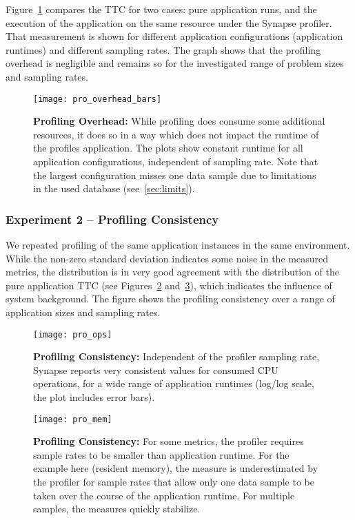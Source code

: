 \documentclass[10pt, conference, compsocconf]{IEEEtran}
\newcommand{\synapse}{Synapse\xspace}
\begin{document}
 Figure~\ref{fig:pro_overhead} compares the TTC for two cases: pure
 application runs, and the execution of the application on the
 same resource under the \synapse profiler.  That measurement is shown
 for different application configurations (application runtimes) and
 different sampling rates.  The graph shows that the profiling overhead
 is negligible and remains so for the
 investigated range of problem sizes and sampling rates.

 \begin{figure}[t]
   \centering
   \texttt{[image: pro\_overhead\_bars]}
   \caption{\textbf{Profiling Overhead:} While profiling does consume
       some additional resources, it does so in a way which does not
       impact the runtime of the profiles application.  The plots show
       constant runtime for all application configurations,
       independent of sampling rate. Note that the largest
       configuration misses one data sample due to limitations in the
       used database (see~\ref{sec:limits}).
     \label{fig:pro_overhead} 
   } 
   \end{figure}


 \subsubsection*{Experiment 2 -- Profiling Consistency}

 We repeated profiling of the same application instances in the same
 environment.  While the non-zero standard deviation indicates some
 noise in the measured metrics, the distribution is in very good
 agreement with the distribution of the pure application TTC (see
 Figures~\ref{fig:pro_ops} and~\ref{fig:pro_mem}), which indicates the
 influence of system background.  The figure shows the profiling
 consistency over a range of application sizes and sampling rates.

 \begin{figure}[t]
   \centering
   \texttt{[image: pro\_ops]}
   \caption{\textbf{Profiling Consistency:} Independent of the
       profiler sampling rate, \synapse reports very consistent
       values for consumed CPU operations, for a wide range of
       application runtimes (log/log scale, the plot includes
       error bars).
     \label{fig:pro_ops} 
   } 
   \end{figure}

 \begin{figure}[t]
   \centering
   \texttt{[image: pro\_mem]}
   \caption{\textbf{Profiling Consistency:} For some metrics, the profiler
     requires sample rates to be smaller than application runtime.  For the
     example here (resident memory), the measure is underestimated by the
     profiler for sample rates that allow only one data sample to be taken over
     the course of the application runtime.  For multiple samples, the measures
     quickly stabilize.
     \label{fig:pro_mem} 
   } 
   \end{figure}
\end{document}
